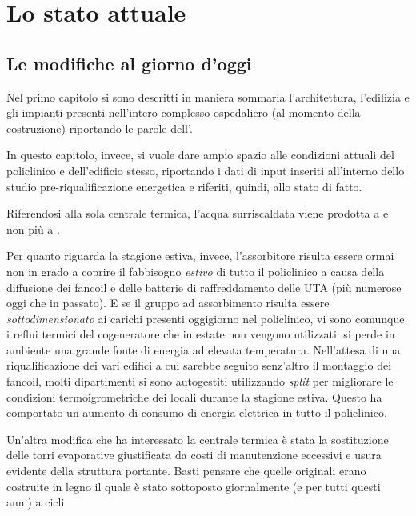 \chapter{Lo stato attuale}
\thispagestyle{empty}
\section{Le modifiche al giorno d'oggi}
Nel primo capitolo si sono descritti in maniera sommaria l'architettura, l'edilizia e gli impianti presenti nell'intero complesso ospedaliero (al momento della costruzione) riportando le parole dell'. 

In questo capitolo, invece, si vuole dare ampio spazio alle condizioni attuali del policlinico e dell'edificio stesso, riportando i dati di input inseriti all'interno dello studio pre-riqualificazione energetica e riferiti, quindi, allo stato di fatto. 

Riferendosi alla sola centrale termica, l'acqua surriscaldata viene prodotta a  e non più a . 

Per quanto riguarda la stagione estiva, invece, l'assorbitore risulta essere ormai non in grado a coprire il fabbisogno \emph{estivo} di tutto il policlinico a causa della diffusione dei fancoil e delle batterie di raffreddamento delle UTA (più numerose oggi che in passato). E se il gruppo ad assorbimento risulta essere \emph{sottodimensionato} ai carichi presenti oggigiorno nel policlinico, vi sono comunque i reflui termici del cogeneratore che in estate non vengono utilizzati: si perde in ambiente una grande fonte di energia ad elevata temperatura. Nell'attesa di una riqualificazione dei vari edifici a cui sarebbe seguito senz'altro il montaggio dei fancoil, molti dipartimenti si sono autogestiti utilizzando \emph{split} per migliorare le condizioni termoigrometriche dei locali durante la stagione estiva. Questo ha comportato un aumento di consumo di energia elettrica in tutto il policlinico.

Un'altra modifica che ha interessato la centrale termica è stata la sostituzione delle torri evaporative giustificata da costi di manutenzione eccessivi e usura evidente della struttura portante. Basti pensare che quelle originali erano costruite in legno il quale è stato sottoposto giornalmente (e per tutti questi anni) a cicli 

